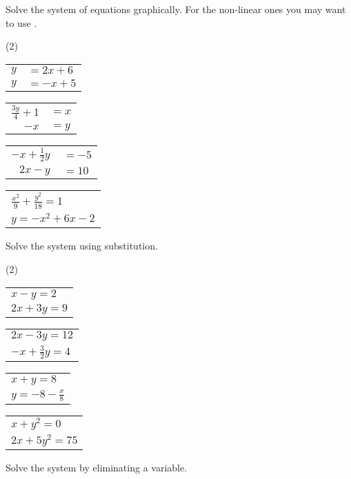 \begin{Exercise}[title={Systems of Equations},label=ex14]
	\Question Solve the system of equations graphically. For the non-linear ones you may want to use \desmos.
		\begin{tasks}(2)
			\task 	
			\begin{tabular}{r@{}l}
			$y$&$=2x+6$\\%
			$y$&$=-x+5$
			\end{tabular}\medskip 
			\task  
			\begin{tabular}{r@{}l}
			$\frac{3y}{4}+1$&$=x$\\%
			$-x$&$=y$
			\end{tabular}   
			\task 
			\begin{tabular}{r@{}l}%
				$-x+\frac{1}{2}y\,$&$=-5$\\
				$2x-y\,$&$=10$
			\end{tabular}\medskip	 
			\task    
			\begin{tabular}{l}
				$\frac{x^2}{9}+\frac{y^2}{18}=1$\\%
				$y=-x^2+6x-2$
			\end{tabular}  
		\end{tasks}
		\Question Solve the system using substitution.
		\begin{tasks}(2)
			\task 	
			\begin{tabular}{l}
				$x-y=2$\\%
				$2x+3y=9$
			\end{tabular}\medskip  
			\task    	
			\begin{tabular}{l}
				$2x-3y=12$\\%
				$-x+\frac{3}{2}y=4$
			\end{tabular} 
			\task 	 
			\begin{tabular}{l}
				$x+y=8$\\%
				$y=-8-\frac{x}{8}$
			\end{tabular} 
			\task    
			\begin{tabular}{l}
				$x+y^2=0$\\%
				$2x+5y^2=75$
			\end{tabular} 
		\end{tasks}
\Question Solve the system by eliminating a variable.

\end{Exercise}
